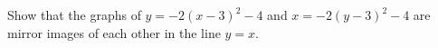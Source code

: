 Show that the graphs of $y=-2(x-3)^2-4$ and $x=-2(y-3)^2-4$ are mirror images of each other in the line $y=x$.
